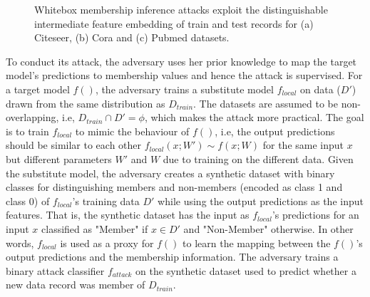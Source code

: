 \begin{figure}[!htb]
\centering
{}
    \caption{Whitebox membership inference attacks exploit the distinguishable intermediate feature embedding of train and test records for (a) Citeseer, (b) Cora and (c) Pubmed datasets.}
\end{figure}

To conduct its attack, the adversary uses her prior knowledge to map the target model's predictions to membership values and hence the attack is supervised.
For a target model $f()$, the adversary trains a substitute model $f_{local}$ on data ($D'$) drawn from the same distribution as $D_{train}$.
The datasets are assumed to be non-overlapping, i.e, $D_{train} \cap D' = \phi$, which makes the attack more practical.
The goal is to train $f_{local}$ to mimic the behaviour of $f()$, i.e, the output predictions should be similar to each other $f_{local}(x;W') \sim f(x;W)$ for the same input $x$ but different parameters $W'$ and $W$ due to training on the different data.
Given the substitute model, the adversary creates a synthetic dataset with binary classes for distinguishing members and non-members (encoded as class 1 and class 0) of $f_{local}$'s training data $D'$ while using the output predictions as the input features.
That is, the synthetic dataset has the input as $f_{local}$'s predictions for an input $x$ classified as "Member" if $x \in D'$ and "Non-Member" otherwise.
In other words, $f_{local}$ is used as a proxy for $f()$ to learn the mapping between the $f()$'s output predictions and the membership information.
The adversary trains a binary attack classifier $f_{attack}$ on the synthetic dataset used to predict whether a new data record was member of $D_{train}$.


